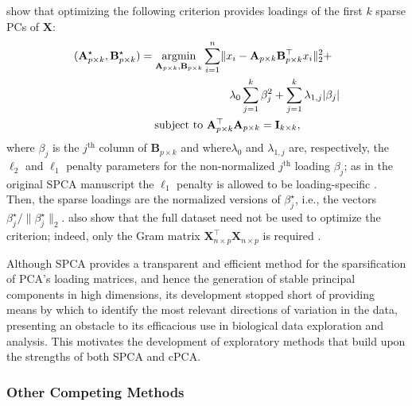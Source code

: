 \citet{Zou2006} show that optimizing the following criterion provides loadings of the first $k$ sparse PCs of $\mathbf{X}$:
\begin{equation}\label{eq:spca}
\begin{aligned}
  (\mathbf{A}^\star_{p \times k}, \mathbf{B}^\star_{p \times k}) & =
    \operatorname*{argmin}_{\mathbf{A}_{p \times k}, \mathbf{B}_{p \times k}}
    \sum_{i=1}^n \lVert x_i - \mathbf{A}_{p \times k}\mathbf{B}_{p \times k}^\top x_i \rVert_2^2 + \\
    & \quad \quad \quad \quad \quad \quad \quad \quad \lambda_0 \sum_{j=1}^k\beta_j^2 +
    \sum_{j=1}^k\lambda_{1,j} \lvert \beta_j \rvert \\
  & \quad \; \text{subject to }\mathbf{A}_{p \times k}^\top\mathbf{A}_{p \times k} = \mathbf{I}_{k \times k},
\end{aligned}
\end{equation}
where $\beta_j$ is the $j^{\text{th}}$ column of $\mathbf{B}_{p \times k}$ and where$\lambda_0$ and $\lambda_{1,j}$ are, respectively, the $\ell_2$ and $\ell_1$ penalty parameters for the non-normalized $j^{\text{th}}$  loading $\beta_j$; as in the original SPCA manuscript the $\ell_1$ penalty is allowed to be loading-specific \citep{Zou2006}. Then, the sparse loadings are the normalized versions of $\beta_j^\star$, i.e., the vectors $\beta_j^\star/\lVert\beta_j^\star\rVert_2$. \citet{Zou2006} also show that the full dataset need not be used to optimize the criterion; indeed, only the Gram matrix $\mathbf{X}_{n \times p}^\top\mathbf{X}_{n \times p}$ is required \citep{Zou2006}. 

Although SPCA provides a transparent and efficient method for the sparsification of PCA's loading matrices, and hence the generation of stable principal components in high dimensions, its development stopped short of providing means by which to identify the most relevant directions of variation in the data, presenting an obstacle to its efficacious use in biological data exploration and analysis. This motivates the development of exploratory methods that build upon the strengths of both SPCA and cPCA.

\subsubsection{Other Competing Methods}\label{others}

